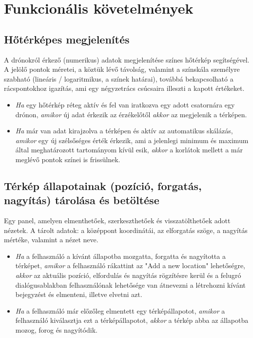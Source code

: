 \section{Funkcionális követelmények}

\subsection{Hőtérképes megjelenítés}

A drónokról érkező (numerikus) adatok megjelenítése színes hőtérkép segítségével.
A jelölő pontok méretei, a köztük lévő távolság, valamint a színskála személyre szabható (lineáris / logaritmikus, a színek határai), továbbá bekapcsolható a rácspontokhoz igazítás, ami egy négyzetrács csúcsaira illeszti a kapott értékeket.

\begin {itemize}
  \item \textit{Ha} egy hőtérkép réteg aktív és fel van iratkozva egy adott csatornára egy drónon, \textit{amikor} új adat érkezik az érzékelőtől \textit{akkor} az megjelenik a térképen.
  \item \textit{Ha} már van adat kirajzolva a térképen és aktív az automatikus skálázás, \textit{amikor} egy új szélsőséges érték érkezik, ami a jelenlegi minimum és maximum által meghatározott tartományom kívül esik, \textit{akkor} a korlátok mellett a már meglévő pontok színei is frissülnek.
\end {itemize}


\subsection{Térkép állapotainak (pozíció, forgatás, nagyítás) tárolása és betöltése}

Egy panel, amelyen elmenthetőek, szerkeszthetőek és visszatölthetőek adott nézetek. A tárolt adatok: a középpont koordinátái, az elforgatás szöge, a nagyítás mértéke, valamint a nézet neve.

\begin {itemize}
  \item \textit{Ha} a felhasználó a kívánt állapotba mozgatta, forgatta és nagyította a térképet, \textit{amikor} a felhasználó rákattint az "Add a new location" lehetőségre, \textit{akkor} az aktuális pozíció, elfordulás és nagyítás rögzítésre kerül és a felugró dialógusablakban felhasználónak lehetősége van átnevezni a létrehozni kívánt bejegyzést és elmenteni, illetve elvetni azt.
  \item \textit{Ha} a felhasználó már előzőleg elmentett egy térképállapotot, \textit{amikor} a felhasználó kiválasztja ezt a térképállapotot, \textit{akkor} a térkép abba az állapotba mozog, forog és nagyítódik.
\end {itemize}


